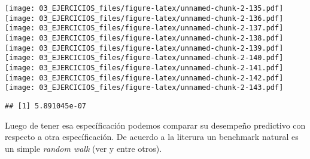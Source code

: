 \documentclass[
]{book}
\newenvironment{Shaded}{\begin{snugshade}}{\end{snugshade}}
\newcommand{\AttributeTok}[1]{\textcolor[rgb]{0.77,0.63,0.00}{#1}}
\newcommand{\DecValTok}[1]{\textcolor[rgb]{0.00,0.00,0.81}{#1}}
\newcommand{\FloatTok}[1]{\textcolor[rgb]{0.00,0.00,0.81}{#1}}
\newcommand{\FunctionTok}[1]{\textcolor[rgb]{0.00,0.00,0.00}{#1}}
\newcommand{\NormalTok}[1]{#1}
\newcommand{\OtherTok}[1]{\textcolor[rgb]{0.56,0.35,0.01}{#1}}
\newcommand{\SpecialCharTok}[1]{\textcolor[rgb]{0.00,0.00,0.00}{#1}}
\newcommand{\StringTok}[1]{\textcolor[rgb]{0.31,0.60,0.02}{#1}}
\begin{document}
\texttt{[image: 03\_EJERCICIOS\_files/figure-latex/unnamed-chunk-2-135.pdf]} \texttt{[image: 03\_EJERCICIOS\_files/figure-latex/unnamed-chunk-2-136.pdf]} \texttt{[image: 03\_EJERCICIOS\_files/figure-latex/unnamed-chunk-2-137.pdf]} \texttt{[image: 03\_EJERCICIOS\_files/figure-latex/unnamed-chunk-2-138.pdf]} \texttt{[image: 03\_EJERCICIOS\_files/figure-latex/unnamed-chunk-2-139.pdf]} \texttt{[image: 03\_EJERCICIOS\_files/figure-latex/unnamed-chunk-2-140.pdf]} \texttt{[image: 03\_EJERCICIOS\_files/figure-latex/unnamed-chunk-2-141.pdf]} \texttt{[image: 03\_EJERCICIOS\_files/figure-latex/unnamed-chunk-2-142.pdf]} \texttt{[image: 03\_EJERCICIOS\_files/figure-latex/unnamed-chunk-2-143.pdf]}

\begin{Shaded}
\end{Shaded}

\begin{verbatim}
## [1] 5.891045e-07
\end{verbatim}

Luego de tener esa específicación podemos comparar su desempeño predictivo con respecto a otra específicación. De acuerdo a la literura un benchmark natural es un simple \emph{random walk} (ver \citet{Ohanian2001} y \citet{Rogoff1983} entre otros).
\end{document}
